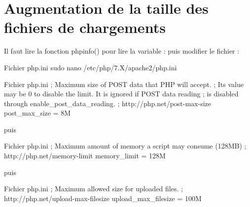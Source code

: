 \section{Augmentation de la taille des fichiers de chargements}

Il faut lire la fonction phpinfo() pour lire la variable :
puis modifier le fichier :

\begin{Bash}{Fichier php.ini}
sudo nano /etc/php/7.X/apache2/php.ini
\end{Bash}


\begin{Bash}{Fichier php.ini}
; Maximum size of POST data that PHP will accept.
; Its value may be 0 to disable the limit. It is ignored if POST data reading
; is disabled through enable_post_data_reading.
; http://php.net/post-max-size
post_max_size = 8M
\end{Bash}

puis
\begin{Bash}{Fichier php.ini}
; Maximum amount of memory a script may consume (128MB)
; http://php.net/memory-limit
memory_limit = 128M
\end{Bash}

puis 
\begin{Bash}{Fichier php.ini}
; Maximum allowed size for uploaded files.
; http://php.net/upload-max-filesize
upload_max_filesize = 100M
\end{Bash}
